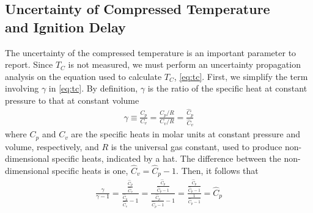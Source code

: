\documentclass[../main.tex]{subfiles}
\begin{document}
\subsection[Uncertainty of Compressed Temperature and Ignition Delay]%
{Uncertainty of Compressed Temperature\\ and Ignition Delay}
\label{sec:uncertainty}

The uncertainty of the compressed temperature is an important parameter
to report. Since $T_C$ is not measured, we must perform an uncertainty
propagation analysis on the equation used to calculate $T_C$,
\cref{eq:tc}. First, we simplify the term involving $\gamma$ in
\cref{eq:tc}. By definition, $\gamma$ is the ratio of the specific heat
at constant pressure to that at constant volume
%
\begin{align}
\gamma \equiv \frac{C_p}{C_v} = \frac{C_p/R}{C_v/R} = \frac{\hat{C}_p}{\hat{C}_v}
\end{align}
%
where $C_p$ and $C_v$ are the specific heats in molar units at constant
pressure and volume, respectively, and $R$ is the universal gas constant,
used to produce non-dimensional specific heats, indicated by a hat. The
difference between the non-dimensional specific heats is one,
$\hat{C}_v = \hat{C}_p - 1$. Then, it follows that
%
\begin{align}
\label{eq:simplify-gamma}
\frac{\gamma}{\gamma - 1} = \frac{\frac{\hat{C}_p}{\hat{C}_v}}{\frac{\hat{C}_p}{\hat{C}_v} - 1}
= \frac{\frac{\hat{C}_p}{\hat{C}_p - 1}}{\frac{\hat{C}_p}{\hat{C}_p - 1} - 1}
= \frac{\frac{\hat{C}_p}{\hat{C}_p - 1}}{\frac{1}{\hat{C}_p - 1}}
= \hat{C}_p
\end{align}
\end{document}
